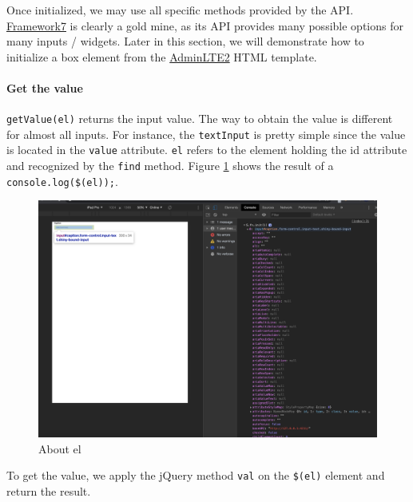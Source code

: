 \documentclass[]{book}
\let\oldparagraph\paragraph
\renewcommand{\paragraph}[1]{\oldparagraph{#1}\mbox{}}
\begin{document}
Once initialized, we may use all specific methods provided by the API. \href{https://framework7.io}{Framework7} is clearly a gold mine, as its API provides many possible options for many inputs / widgets. Later in this section, we will demonstrate how to initialize a box element from the \href{https://adminlte.io/docs/2.4/js-box-widget}{AdminLTE2} HTML template.

\hypertarget{get-the-value}{%
\paragraph{Get the value}\label{get-the-value}}

\texttt{getValue(el)} returns the input value. The way to obtain the value is different for almost all inputs. For instance, the \texttt{textInput} is pretty simple since the value is located in the \texttt{value} attribute. \texttt{el} refers to the element holding the id attribute and recognized by the \texttt{find} method. Figure \ref{fig:shiny-el} shows the result of a \texttt{console.log(\$(el));}.

\begin{figure}
\includegraphics[width=35.5in]{images/survival-kit/shiny-el} \caption{About el}\label{fig:shiny-el}
\end{figure}

To get the value, we apply the jQuery method \texttt{val} on the \texttt{\$(el)} element and return the result.
\end{document}
